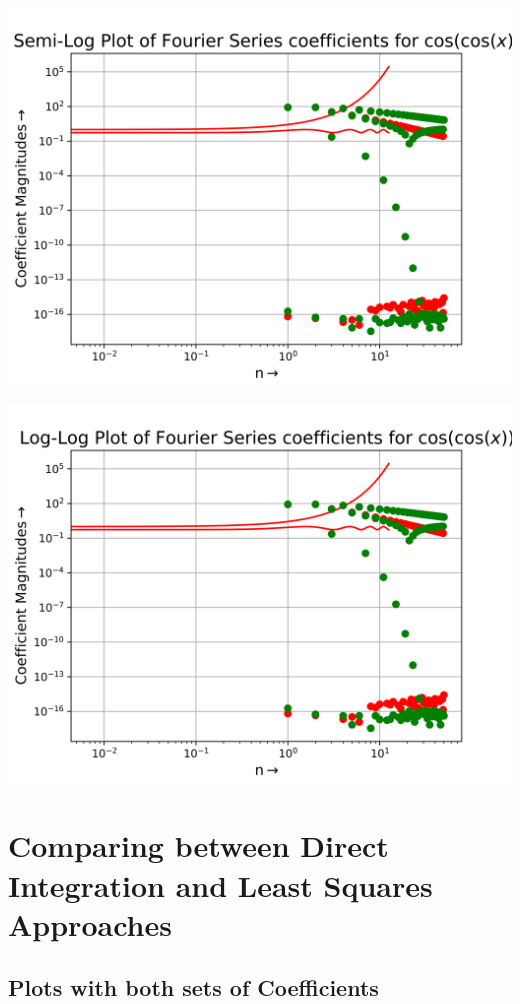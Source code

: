\documentclass[12pt]{article}
\begin{document}
\begin{center}
    \includegraphics[scale=0.8]{images/Figure9.png}
\end{center}
\begin{center}
    \includegraphics[scale=0.8]{images/Figure10.png}
\end{center}
\pagebreak

\section{Comparing between Direct Integration and Least Squares Approaches}

\subsection{Plots with both sets of Coefficients}
\end{document}
